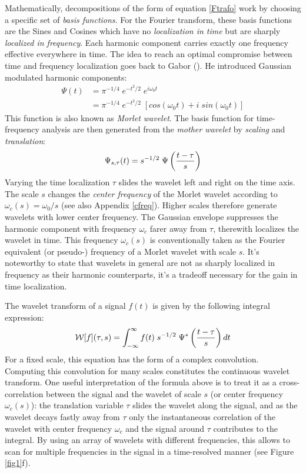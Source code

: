 Mathematically, decompositions of the form of equation \ref{Ftrafo} work by choosing a specific set of \textit{basis functions}. For the Fourier transform, these basis functions are the Sines and Cosines which have no \textit{localization in time} but are sharply \textit{localized in frequency}. Each harmonic component carries exactly one frequency effective everywhere in time. The idea to reach an optimal compromise between time and frequency localization goes back to Gabor (\cite{Gabor1946}). He introduced Gaussian modulated harmonic components:
\begin{align}
  \Psi(t) &= \pi^{-1/4} \; e^{-t^2/2} \; e^{i\omega_0 t}\\
  &= \pi^{-1/4} \; e^{-t^2/2} \; \left[cos(\omega_0 t) + i\; sin(\omega_0 t) \right]
\end{align}
This function is also known as \textit{Morlet wavelet}. The basis function for time-frequency analysis are then generated from the \textit{mother wavelet} by \textit{scaling} and \textit{translation}:
\begin{equation}
  \Psi_{s,\tau}(t) = s^{-1/2}\;\Psi \left(\frac{t - \tau}{s}\right)
\end{equation}
Varying the time localization $\tau$ slides the wavelet left and right on the time axis. The scale $s$ changes the \textit{center frequency} of the Morlet wavelet according to $\omega_c(s) = \omega_0/s$ (see also Appendix \ref{cfreq}). Higher scales therefore generate wavelets with lower center frequency. The Gaussian envelope suppresses the harmonic component with frequency $\omega_c$ farer away from $\tau$, therewith localizes the wavelet in time. This frequency $\omega_c(s)$ is conventionally taken as the Fourier equivalent (or pseudo-) frequency of a Morlet wavelet with scale $s$. It's noteworthy to state that wavelets in general are not as sharply localized in frequency as their harmonic counterparts, it's a tradeoff necessary for the gain in time localization.

The wavelet transform of a signal $f(t)$ is given by the following integral expression:
\begin{equation}
\label{Wtrafo}
\mathcal{W}[f](\tau, s) = \int_{-\infty}^{\infty} f(t) \; s^{-1/2} \;
                    \Psi^* \left(\frac{t - \tau}{s} \right) dt
\end{equation}    
For a fixed scale, this equation has the form of a complex convolution. Computing this convolution for many scales constitutes the continuous wavelet transform. One useful interpretation of the formula above is to treat it as a cross-correlation between the signal and the wavelet of scale $s$ (or center frequency $\omega_c(s)$): the translation variable $\tau$ slides the wavelet along the signal, and as the wavelet decays fastly away from $\tau$ only the instantaneous correlation of the wavelet with center frequency $\omega_c$ and the signal around $\tau$ contributes to the integral. By using an array of wavelets with different frequencies, this allows to scan for multiple frequencies in the signal in a time-resolved manner (see Figure \ref{fig1}f).

